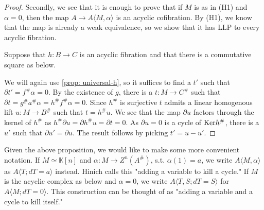 \documentclass[../thesis.tex]{subfiles}
\begin{document}
\begin{proof}
                Secondly, we see that it is enough to prove that if $M$ is as in (H1) and $\alpha = 0$, then the map $A \rightarrow A\langle M,\alpha\rangle$ is an acyclic cofibration. By (H1), we know that the map is already a weak equivalence, so we show that it has LLP to every acyclic fibration.
                
                Suppose that $h: B \rightarrow C$ is an acyclic fibration and that there is a commutative square as below.
                \begin{center}
                \end{center}

                We will again use \ref{prop: universal-h}, so it suffices to find a $t'$ such that $\partial t' = f^\#\alpha = 0$. By the existence of $g$, there is a $t : M \rightarrow C^\#$ such that $\partial t = g^\#a^\#\alpha = h^\# f^\# \alpha = 0$. Since $h^\#$ is surjective $t$ admits a linear homogenous lift $u : M \rightarrow B^\#$ such that $t = h^\#u$. We see that the map $\partial u$ factors through the kernel of $h^\#$ as $h^\# \partial u = \partial h^\# u = \partial t = 0$. As $\partial u = 0$ is a cycle of $\tt{Ker}h^\#$, there is a $u'$ such that $\partial u' = \partial u$. The result follows by picking $t' = u - u'$.

            \end{proof}

            Given the above proposition, we would like to make some more convenient notation. If $M\simeq \mathbb{K}[n]$ and $\alpha: M \rightarrow Z^n(A^\#)$, s.t. $\alpha(1) = a$, we write $A\langle M,\alpha\rangle$ as $A\langle T; dT = a\rangle$ instead. Hinich calls this "adding a variable to kill a cycle." If $M$ is the acyclic complex as below and $\alpha = 0$, we write $A\langle T, S; dT = S\rangle$ for $A\langle M; dT = 0 \rangle$. This construction can be thought of as "adding a variable and a cycle to kill itself."

            \begin{center}
            \end{center}
\end{document}
